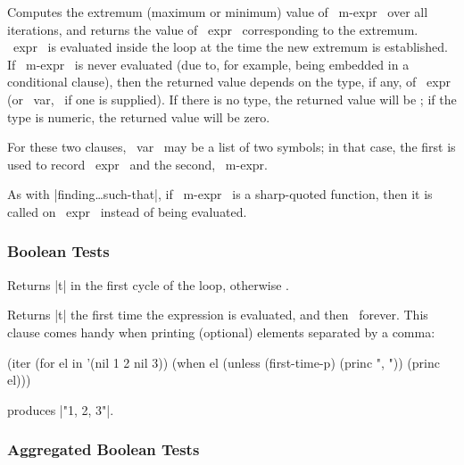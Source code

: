 \begin{clauses}
\startitem
{}
\finishitem
Computes the extremum (maximum or minimum) value of ~m-expr~ over all
iterations, and returns the value of ~expr~ corresponding to the
extremum.  ~expr~ is evaluated inside the loop at the time the new
extremum is established.  If ~m-expr~ is never evaluated (due to, for
example, being embedded in a conditional clause), then the returned
value depends on the type, if any, of ~expr~ (or ~var,~ if
one is supplied).  If there is no type, the returned
value will be \nil; if the type is numeric, the returned value will be
zero.

\cpar For these two clauses, ~var~ may be a list of two
symbols; in that case, the first is used to record ~expr~ and
the second, ~m-expr.~  

\cpar As with |finding\dots such-that|, if ~m-expr~ is a sharp-quoted
function, then it is called on ~expr~ instead of being evaluated.

\end{clauses}

\subsubsection{Boolean Tests}

\begin{clauses}

Returns |t| in the first cycle of the loop, otherwise \nil.

Returns |t| the first time the expression is evaluated, and then \nil\ forever.
This clause comes handy when printing (optional) elements separated
by a comma:

\begin{program}
(iter (for el in '(nil 1 2 nil 3))
      (when el
        (unless (first-time-p)
          (princ ", "))
        (princ el)))
\end{program}
produces |"1, 2, 3"|.

\end{clauses}

\subsubsection{Aggregated Boolean Tests}

